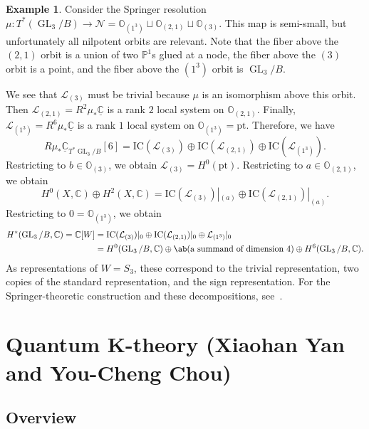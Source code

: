 \documentclass{amsart}
\theoremstyle{definition}
\newtheorem{exm}[thm]{Example}
\theoremstyle{remark}
\theoremstyle{plain}
\theoremstyle{definition}
\theoremstyle{remark}
\newcommand{\C}{\mathbb{C}}
\renewcommand{\P}{\mathbb{P}}
\newcommand{\mc}[1]{\mathcal{#1}}
\newcommand{\mr}[1]{\mathrm{#1}}
\newcommand{\on}[1]{\operatorname{#1}}
\newcommand{\ul}[1]{\underline{#1}}
\newcommand{\1}{\mathbf{1}}
\newcommand{\2}{\mathbf{2}}
\newcommand{\3}{\mathbf{3}}
\begin{document}
\begin{exm}
    Consider the Springer resolution \(\mu \colon T^*(\on{GL}_3/B) \to \mc{N} = \mathbb{O}_{(1^3)} \sqcup \mathbb{O}_{(2,1)} \sqcup \mathbb{O}_{(3)}\). This map is semi-small, but unfortunately all nilpotent orbits are relevant. Note that the fiber above the \((2,1)\) orbit is a union of two \(\P^1\)s glued at a node, the fiber above the \((3)\) orbit is a point, and the fiber above the \((1^3)\) orbit is \(\on{GL}_3/B\).

    We see that \(\mc{L}_{(3)}\) must be trivial because \(\mu\) is an isomorphism above this orbit. Then \(\mc{L}_{(2,1)} = R^2 \mu_* \ul{\C}\) is a rank \(2\) local system on \(\mathbb{O}_{(2,1)}\). Finally, \(\mc{L}_{(1^3)} = R^6 \mu_* \ul{\C}\) is a rank \(1\) local system on \(\mathbb{O}_{(1^3)} = \mr{pt}\). Therefore, we have
    \[ R \mu_* \ul{\C}_{T^*\on{GL}_3/B}[6] = \mr{IC}(\mc{L}_{(3)}) \oplus \mr{IC}(\mc{L}_{(2,1)}) \oplus \mr{IC}(\mc{L}_{(1^3)}). \]
    Restricting to \(b \in \mathbb{O}_{(3)}\), we obtain \(\mc{L}_{(3)} = H^0(\mr{pt})\). Restricting to \(a \in \mathbb{O}_{(2,1)}\), we obtain
    \[ H^0(X, \C) \oplus H^2(X, \C) = \mr{IC}(\mc{L}_{(3)})|_{(a)} \oplus \mr{IC}(\mc{L}_{(2,1)})|_{(a)}. \]
    Restricting to \(0 = \mathbb{O}_{(1^3)}\), we obtain
    \begin{align*}
        H^*(\on{GL}_3/B, \C) = \C[W] &= \mr{IC}(\mc{L}_{(3)})|_0 \oplus \mr{IC}(\mc{L}_{(2,1)})|_0 \oplus \mc{L}_{(1^3)}|_0 \\
        &= H^0(\on{GL}_3/B, \C) \oplus \ab(\text{a summand of dimension } 4) \oplus H^6(\on{GL}_3/B, \C).
    \end{align*}
    As representations of \(W = S_3\), these correspond to the trivial representation, two copies of the standard representation, and the sign representation. For the Springer-theoretic construction and these decompositions, see~\cite{BorhoMacPherson1983}.
\end{exm}

\section{Quantum K-theory (Xiaohan Yan and You-Cheng Chou)}%
\label{sec:Quantum K-theory (Xiaohan Yan and You-Cheng Chou)}

\subsection{Overview}%
\label{sub:Overview}
\end{document}
